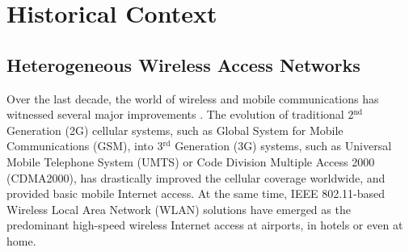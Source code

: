 \chapter{Historical Context} %
\label{cha:literature}

\minitoc
\vspace{10mm}

\section{Heterogeneous Wireless Access Networks} %
\label{sec:heterogeneous_wireless_access_networks}
Over the last decade, the world of wireless and mobile communications has witnessed several major improvements \cite{ABC03}. The evolution of traditional 2$^\text{nd}$ Generation (2G) cellular systems, such as Global System for Mobile Communications (GSM), into 3$^{\text{rd}}$ Generation (3G) systems, such as Universal Mobile Telephone System (UMTS) or Code Division Multiple Access 2000 (CDMA2000), has drastically improved the cellular coverage worldwide, and provided basic mobile Internet access. At the same time, IEEE 802.11-based Wireless Local Area Network (WLAN) solutions have emerged as the predominant high-speed wireless Internet access at airports, in hotels or even at home.

